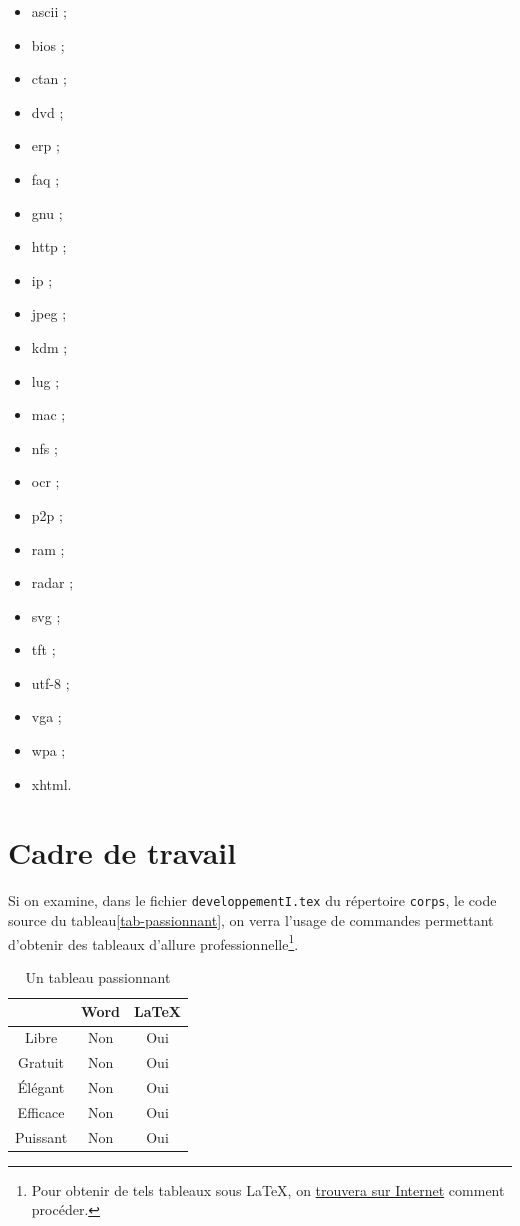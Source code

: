 \documentclass[12pt,space=onehalf,version=final]{yathesis}
\newcommand\fichier[1]{\texttt{#1}}
\begin{document}
\begin{itemize}
\item \gls{ascii} ;
\item \gls{bios} ;
\item \gls{ctan} ;
\item \gls{dvd} ;
\item \gls{erp} ;
\item \gls{faq} ;
\item \gls{gnu} ;
\item \gls{http} ;
\item \gls{ip} ;
\item \gls{jpeg} ;
\item \gls{kdm} ;
\item \gls{lug} ;
\item \gls{mac} ;
\item \gls{nfs} ;
\item \gls{ocr} ;
\item \gls{p2p} ;
\item \gls{ram} ;
\item \gls{radar} ;
\item \gls{svg} ;
\item \gls{tft} ;
\item \gls{utf-8} ;
\item \gls{vga} ;
\item \gls{wpa} ;
\item \gls{xhtml}.
\end{itemize}
%
\section{Cadre de travail}\label{sec-cadre}
%
Si on examine, dans le fichier
\fichier{developpementI.tex} du répertoire \fichier{corps}, le code source
du tableau\vref{tab-passionnant}, on verra l'usage
de commandes permettant d'obtenir des tableaux d'allure
professionnelle\footnote{Pour obtenir de tels tableaux sous \LaTeX{}, on
  \href{http://www.tug.org/pracjourn/2007-1/mori/mori.pdf}{trouvera sur
    Internet} comment procéder.}.
%
\begin{table}[ht]
  \centering
  \begin{tabular}{ccc}
    \toprule
    \multicolumn{1}{c}{} & Word & \LaTeX{} \\
    \midrule
    Libre                & Non  & Oui      \\
    Gratuit              & Non  & Oui      \\
    Élégant              & Non  & Oui      \\
    Efficace             & Non  & Oui      \\
    Puissant             & Non  & Oui      \\
    \bottomrule
  \end{tabular}
  \caption{Un tableau passionnant}
  \label{tab-passionnant}
\end{table}
\end{document}
